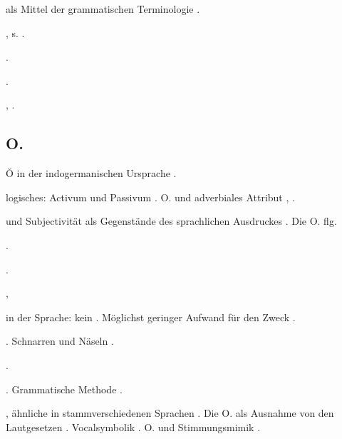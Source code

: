 \begin{register}
 als Mittel der grammatischen Terminologie \pageref{sp.116}.

, s. .


 \pageref{sp.150}.

 \pageref{sp.103}.

 \pageref{sp.36}, \pageref{sp.182}.


\subsection*{O.}\label{reg.O}

Ŏ in der indogermanischen Ursprache \pageref{sp.186}.


 logisches: Activum und Passivum \pageref{sp.95}. O. und adverbiales Attribut \pageref{sp.102}, \pageref{sp.461}.

 und Subjectivität als Gegenstände des sprachlichen Ausdruckes \pageref{sp.438}. Die O. \pageref{sp.438} flg.

 \pageref{sp.104}.

 \pageref{sp.282}.

,  \pageref{sp.163}

 in der Sprache: kein  \pageref{sp.100}. Möglichst geringer Aufwand für den Zweck \pageref{sp.182}.

. Schnarren und Näseln \pageref{sp.184}.

 \pageref{sp.282}.


. Grammatische Methode \pageref{sp.110}.


, ähnliche in stammverschiedenen Sprachen \pageref{sp.154}. Die O. als Ausnahme von den Lautgesetzen \pageref{sp.208}.  Vocalsymbolik \pageref{sp.255}.  O. und Stimmungsmimik \pageref{sp.378}.


\end{register}
